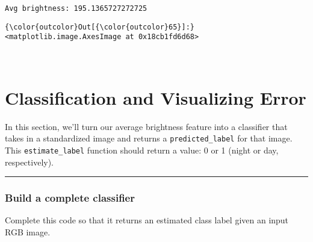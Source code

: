 \documentclass[11pt]{article}
\begin{document}
    \begin{Verbatim}[commandchars=\\\{\}]
Avg brightness: 195.1365727272725

    \end{Verbatim}

\begin{Verbatim}[commandchars=\\\{\}]
{\color{outcolor}Out[{\color{outcolor}65}]:} <matplotlib.image.AxesImage at 0x18cb1fd6d68>
\end{Verbatim}
            
    \begin{center}
    \end{center}
    { \hspace*{\fill} \\}
    
    \section{Classification and Visualizing
Error}\label{classification-and-visualizing-error}

In this section, we'll turn our average brightness feature into a
classifier that takes in a standardized image and returns a
\texttt{predicted\_label} for that image. This \texttt{estimate\_label}
function should return a value: 0 or 1 (night or day, respectively).

    \begin{center}\rule{0.5\linewidth}{\linethickness}\end{center}

\subsubsection{Build a complete
classifier}\label{build-a-complete-classifier}

Complete this code so that it returns an estimated class label given an
input RGB image.
\end{document}
